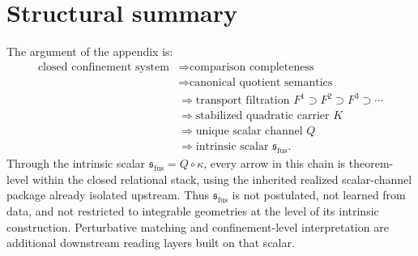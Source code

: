 \section{Structural summary}
\label{sec:fusion-summary}
The argument of the appendix is:
\begin{align*}
	\text{closed confinement system} & \Longrightarrow \text{comparison completeness}                                      \\
	                                 & \Longrightarrow \text{canonical quotient semantics}                                 \\
	                                 & \Longrightarrow \text{transport filtration } F^1\supset F^2\supset F^3\supset\cdots \\
	                                 & \Longrightarrow \text{stabilized quadratic carrier } K                              \\
	                                 & \Longrightarrow \text{unique scalar channel } Q                                     \\
	                                 & \Longrightarrow \text{intrinsic scalar } \mathfrak s_{\mathrm{fus}} .
\end{align*}
Through the intrinsic scalar \(\mathfrak s_{\mathrm{fus}}=Q\circ\kappa\), every arrow in this
chain is theorem-level within the closed relational stack, using the
inherited realized scalar-channel package already isolated upstream.
Thus \(\mathfrak s_{\mathrm{fus}}\) is not postulated, not learned from data, and not restricted
to integrable geometries at the level of its intrinsic construction.
Perturbative matching and confinement-level interpretation are
additional downstream reading layers built on that scalar.
